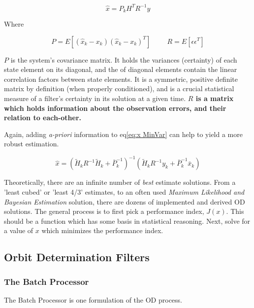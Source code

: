 \documentclass[12pt,a4paper,oneside]{article}
\numberwithin{equation}{section}   		%
\newcommand{\bad}[1]{\color{red}\textbf{#1}\color{black}}
\begin{document}
\begin{equation}
	\hat{x} = P_k H^T R^{-1} y
	\label{eq:x MinVar}
\end{equation}

Where

\begin{displaymath}
	P = E[(\hat{x}_k - x_k)(\hat{x}_k - x_k)^T]
	\hspace{1cm}
	R=E[\epsilon \epsilon^T] 
\end{displaymath}


$P$ is the system's covariance matrix. It holds the variances (certainty) of each state element on its diagonal, and the of diagonal elements contain the linear correlation factors between state elements. It is a symmetric, positive definite matrix by definition (when properly conditioned), and is a crucial statistical measure of a filter's certainty in its solution at a given time. \bad{$R$ is a matrix which holds information about the observation errors, and their relation to each-other. }

Again, adding \emph{a-priori} information to eq\eqref{eq:x MinVar} can help to yield a more robust estimation.

\begin{equation}
	\hat{x} = (\tilde{H}_k R^{-1} \tilde{H}_k + \bar{P}_k^{-1})^{-1}   (\tilde{H}_k R^{-1} y_k + \bar{P}_k^{-1} \bar{x}_k)
	\label{eq:x MinVarap}
\end{equation}

Theoretically, there are an infinite number of \emph{best} estimate solutions. From a 'least cubed' or 'least 4/3' estimates, to an often used \emph{Maximum Likelihood and Bayesian Estimation} solution, there are dozens of implemented and derived OD solutions. The general process is to first pick a performance index, $J(x)$. This should be a function which has some basis in statistical reasoning. Next, solve for a value of $x$ which minimizes the performance index. 




\subsection{Orbit Determination Filters} 


\subsubsection{The Batch Processor}
The Batch Processor is one formulation of the OD process. 
\end{document}
